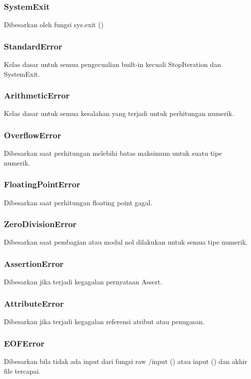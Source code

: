 \subsubsection{SystemExit}
Dibesarkan oleh fungsi sys.exit ()

\subsubsection{StandardError}
Kelas dasar untuk semua pengecualian built-in kecuali StopIteration dan SystemExit.

\subsubsection{ArithmeticError}
Kelas dasar untuk semua kesalahan yang terjadi untuk perhitungan numerik.

\subsubsection{OverflowError}
Dibesarkan saat perhitungan melebihi batas maksimum untuk suatu tipe numerik.

\subsubsection{FloatingPointError}
Dibesarkan saat perhitungan floating point gagal.

\subsubsection{ZeroDivisionError}
Dibesarkan saat pembagian atau modul nol dilakukan untuk semua tipe numerik.

\subsubsection{AssertionError}
Dibesarkan jika terjadi kegagalan pernyataan Assert.

\subsubsection{AttributeError}
Dibesarkan jika terjadi kegagalan referensi atribut atau penugasan. 

\subsubsection{EOFError}
Dibesarkan bila tidak ada input dari fungsi raw $ / $input () atau input () dan akhir file tercapai.

